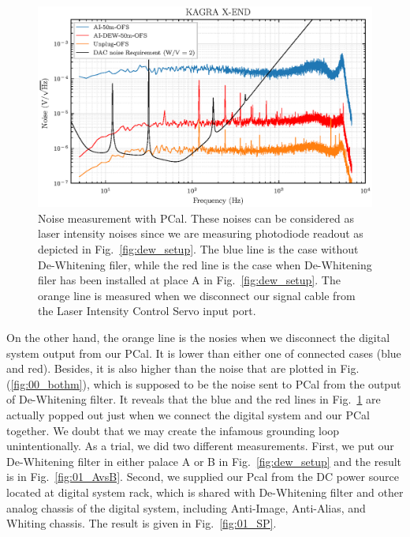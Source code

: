 \begin{figure}[hbt!]
\centering
\includegraphics[width=1\textwidth]{figure/noise/01_all}
\caption[Noise measurement with PCal]{ Noise measurement with PCal. These noises can be considered as laser intensity noises since we are measuring photodiode readout as depicted in Fig.~\ref{fig:dew_setup}. The blue line is the case without De-Whitening filer, while the red line is the case when De-Whitening filer has been installed at place A in Fig.~\ref{fig:dew_setup}. The orange line is measured when we disconnect our signal cable from the Laser Intensity Control Servo input port.}
\label{fig:01_all}
\end{figure}

On the other hand, the orange line is the nosies when we disconnect the digital system output from our PCal. It is lower than either one of connected cases (blue and red). Besides, it is also higher than the noise that are plotted in Fig.(\ref{fig:00_bothm}), which is supposed to be the noise sent to PCal from the output of De-Whitening filter. It reveals that the blue and the red lines in Fig.~\ref{fig:01_all} are actually popped out just when we connect the digital system and our PCal together. We doubt that we may create the infamous grounding loop unintentionally. As a trial, we did two different measurements. First, we put our De-Whitening filter in either palace A or B in Fig.~\ref{fig:dew_setup} and the result is in Fig.~\ref{fig:01_AvsB}. Second, we supplied our Pcal from the DC power source located at digital system rack, which is shared with De-Whitening filter and other analog chassis of the digital system, including Anti-Image, Anti-Alias, and Whiting chassis. The result is given in Fig.~\ref{fig:01_SP}.

